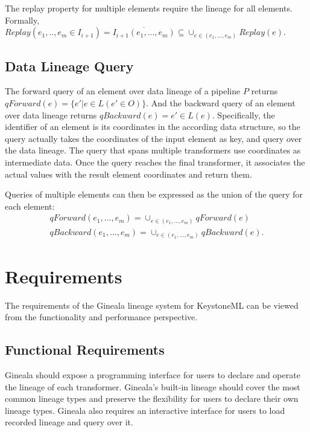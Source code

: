 \documentclass{sig-alternate}
\begin{document}
The replay property for multiple elements require the lineage for all elements. Formally,
$Replay(e_1,..,e_m \in I_{i+1}) = \overline{I_{i+1}(e_1,...,e_m)} \subseteq \cup_{e \in (e_1,...,e_m)} Replay(e) $.

\subsection{Data Lineage Query}
The forward query of an element over data lineage of a pipeline $P$ returns $qForward(e) = \{e' | e \in L(e' \in O)\}$. 
And the backward query of an element over data lineage returns $qBackward(e) = e' \in L(e)$.
Specifically, the identifier of an element is its coordinates in the according data structure, so the query actually takes
the coordinates of the input element as key, and query over the data lineage. The query that spans multiple transformers 
use coordinates as intermediate data. Once the query reaches the final transformer, it associates the actual values
with the result element coordinates and return them.

Queries of multiple elements can then be expressed as the union of the query for each element: 
\begin{equation}
\begin{split}
qForward(e_1, ..., e_m) = \cup_{e \in (e_1, ..., e_m)} qForward(e) \\
qBackward(e_1, ..., e_m) = \cup_{e \in (e_1, ..., e_m)} qBackward(e).
\end{split}
\end{equation}

\section{Requirements}
\label{sec:Req}
The requirements of the Gineala lineage system for KeystoneML can be viewed from the functionality and performance perspective.

\subsection{Functional Requirements}
Gineala should expose a programming interface for users to declare and operate the lineage of each transformer. 
Gineala's built-in lineage should cover the most common lineage types and preserve the flexibility for users to declare their own lineage types.
Gineala also requires an interactive interface for users to load recorded lineage and query over it.
\end{document}
